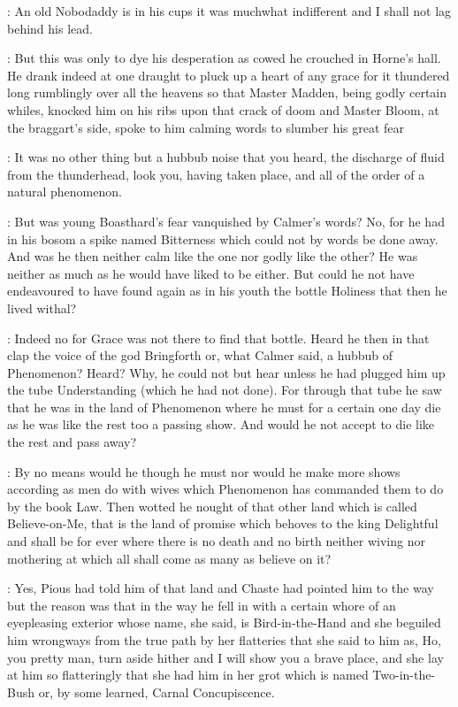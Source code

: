 \documentclass[12pt]{article}
\begin{document}
\SD: An old Nobodaddy is in his cups it was muchwhat indifferent and
I shall not lag behind his lead.

: But this was only to dye his desperation as cowed he
crouched in Horne's hall. He drank indeed at one draught to pluck up a
heart of any grace for it thundered long rumblingly over all the heavens
so that Master Madden, being godly certain whiles, knocked him on his
ribs upon that crack of doom and Master Bloom, at the braggart's side,
spoke to him calming words to slumber his great fear

\Bl: It was no other thing but a hubbub noise that you heard, the
discharge of fluid from the thunderhead, look you, having taken place,
and all of the order of a natural phenomenon.



: But was young Boasthard's fear vanquished by Calmer's words?
No, for he had in his bosom a spike named Bitterness which could not by
words be done away. And was he then neither calm like the one nor godly
like the other? He was neither as much as he would have liked to be
either. But could he not have endeavoured to have found again as in his
youth the bottle Holiness that then he lived withal?

: Indeed no for Grace was not there to find that bottle. Heard he then
in that clap the voice of the god Bringforth or, what Calmer said, a
hubbub of Phenomenon? Heard? Why, he could not but hear unless he had
plugged him up the tube Understanding (which he had not done). For through
that tube he saw that he was in the land of Phenomenon where he must for a
certain one day die as he was like the rest too a passing show. And would
he not accept to die like the rest and pass away?

: By no means would he though he must nor would he make more
shows according as men do with wives which Phenomenon has commanded them
to do by the book Law. Then wotted he nought of that other land which is
called Believe-on-Me, that is the land of promise which behoves to the
king Delightful and shall be for ever where there is no death and no
birth neither wiving nor mothering at which all shall come as many as
believe on it?

: Yes, Pious had told him of that land and Chaste had pointed him to
the way but the reason was that in the way he fell in with a certain whore
of an eyepleasing exterior whose name, she said, is Bird-in-the-Hand and
she beguiled him wrongways from the true path by her flatteries that she
said to him as, Ho, you pretty man, turn aside hither and I will show you
a brave place, and she lay at him so flatteringly that she had him in her
grot which is named Two-in-the-Bush or, by some learned, Carnal
Concupiscence.
\end{document}
